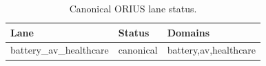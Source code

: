 \begin{table}[htbp]
\centering
\caption{Canonical ORIUS lane status.}
\label{tbl:orius-refresh-lane-status}
\begin{tabular}{lll}
\toprule
Lane & Status & Domains\\
\midrule
battery\_av\_healthcare & canonical & battery,av,healthcare\\
\bottomrule
\end{tabular}
\end{table}

